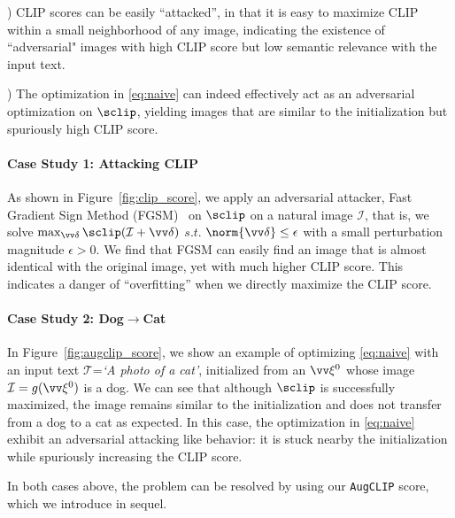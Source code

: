 \documentclass[10pt,twocolumn,letterpaper]{article}
\newcommand{\ourloss}{\texttt{AugCLIP}}
\begin{document}
) CLIP scores can be easily ``attacked'', 
in that it is easy to maximize 
 CLIP  
within a small neighborhood 
of any image, indicating the existence of ``adversarial" 
images with high CLIP score but low semantic relevance with the input text. 

) The optimization in \eqref{eq:naive} can indeed effectively act as 
an adversarial optimization 
on $\sclip$, yielding images that are similar to the initialization but spuriously high CLIP score. 

\paragraph{Case Study 1: Attacking CLIP} 
As shown in Figure~\ref{fig:clip_score}, 
we apply an adversarial  attacker, 
Fast Gradient Sign Method (FGSM)~\cite{goodfellow2014explaining} on $\sclip$ 
on a natural image $\mathcal{I}$, that is, we solve $\max_{\vv \delta} \sclip(\mathcal I + \vv \delta)$ $s.t.$ $\norm{\vv\delta} \leq \epsilon$ with a small perturbation magnitude $\epsilon >0$. 
We find that  FGSM can easily find an image that is almost identical with the original image, 
yet with much higher CLIP score. 
This indicates a danger of ``overfitting'' when we directly maximize the CLIP score. 





\paragraph{Case Study 2: Dog$\to$Cat}
In Figure~\ref{fig:augclip_score}, 
we show an example of optimizing \eqref{eq:naive} 
with an input text $\mathcal{T}$=\emph{`A photo of a cat'}, 
initialized from an $\vv \xi^0$
whose image $\mathcal I = g(\vv\xi^0)$ is a dog. 
We can see that although   $\sclip$ is successfully maximized, 
the image remains similar to the initialization and 
does not transfer from a dog to a cat as expected.  
In this case, the
optimization in \eqref{eq:naive} exhibit  an adversarial attacking like behavior: it is stuck nearby the initialization while spuriously increasing the CLIP score.  

In both cases above, the problem can be resolved by using our {\ourloss} score, which we introduce in sequel. 
\end{document}
